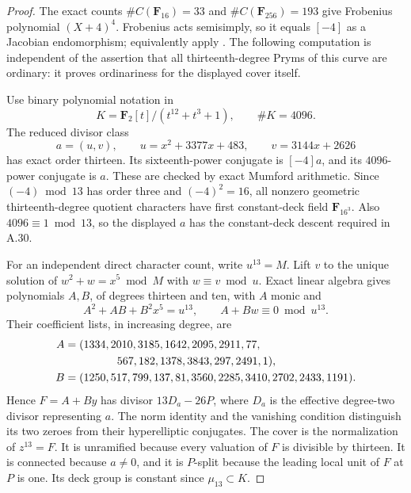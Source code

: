 \documentclass[11pt]{article}
\begin{document}
\begin{proof}
The exact counts \(\#C(\mathbf F_{16})=33\) and
\(\#C(\mathbf F_{256})=193\) give Frobenius polynomial
\((X+4)^4\). Frobenius acts semisimply, so it equals \([-4]\)
as a Jacobian endomorphism; equivalently apply
\cite[Theorem~2(d), p.~140]{AC_Tate1966}.
The following computation is independent of the assertion that all
thirteenth-degree Pryms of this curve are ordinary: it proves
ordinariness for the displayed cover itself.

Use binary polynomial notation in
\[
 K=\mathbf F_2[t]/(t^{12}+t^3+1),\qquad \#K=4096.
\]
The reduced divisor class
\[
 a=(u,v),\qquad
 u=x^2+3377x+483,\qquad v=3144x+2626
\]
has exact order thirteen. Its sixteenth-power conjugate is
\([-4]a\), and its \(4096\)-power conjugate is \(a\).
These are checked by exact Mumford arithmetic. Since
\((-4)\bmod13\) has order three and \((-4)^2=16\), all nonzero
geometric thirteenth-degree quotient characters have first
constant-deck field \(\mathbf F_{16^3}\). Also
\(4096\equiv1\bmod13\), so the displayed \(a\) has the constant-deck
descent required in A.30.

For an independent direct character count, write \(u^{13}=M\).
Lift \(v\) to the unique solution of \(w^2+w=x^5\bmod M\) with
\(w\equiv v\bmod u\). Exact linear algebra gives polynomials
\(A,B\), of degrees thirteen and ten, with \(A\) monic and
\[
 A^2+AB+B^2x^5=u^{13},\qquad A+Bw\equiv0\bmod u^{13}.
\]
Their coefficient lists, in increasing degree, are
\[
\begin{aligned}
 A={}&(1334,2010,3185,1642,2095,2911,77,\\
     &\hspace{12mm}567,182,1378,3843,297,2491,1),\\
 B={}&(1250,517,799,137,81,3560,2285,3410,2702,2433,1191).
\end{aligned}
\]
Hence \(F=A+By\) has divisor \(13D_a-26P\), where
\(D_a\) is the effective degree-two divisor representing \(a\).
The norm identity and the vanishing condition distinguish its
two zeroes from their hyperelliptic conjugates.
The cover is the normalization of \(z^{13}=F\).
It is unramified because every valuation of \(F\) is divisible
by thirteen. It is connected because \(a\ne0\), and it is
\(P\)-split because the leading local unit of \(F\) at \(P\)
is one. Its deck group is constant since \(\mu_{13}\subset K\).


\end{proof}
\end{document}
